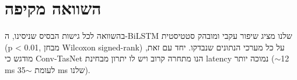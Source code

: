 \section{השוואה מקיפה}

בהשוואה לכל גישות הבסיס שניסינו, ה-\textenglish{BiLSTM} שלנו מציג שיפור עקבי ומובהק סטטיסטית (\textenglish{p < 0.01}, מבחן \textenglish{Wilcoxon signed-rank}) על כל מערכי הנתונים שנבדקו. יחד עם זאת, מודגש כי \textenglish{Conv-TasNet} \cite{luo2019convtasnet} הנו מתחרה קרוב ויש לו יתרון מבחינת \textenglish{latency} נמוכה יותר (\textenglish{$\sim$12 ms} לעומת \textenglish{$\sim$35 ms} שלנו).
